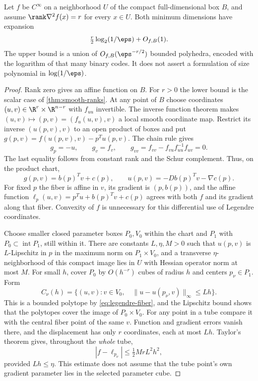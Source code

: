 \begin{theorem}\label{thm:constant-rank}
Let $f$ be $C^\infty$ on a neighborhood $U$ of the compact
full-dimensional box $B$, and assume $\rank\nabla^2f(x)=r$ for every
$x\in U$. Both minimum dimensions have expansion
\[
 \tfrac r2\log_2(1/\eps)+O_{f,B}(1).
\]
The upper bound is a union of $O_{f,B}(\eps^{-r/2})$ bounded polyhedra,
encoded with the logarithm of that many binary codes. It does not
assert a formulation of size polynomial in $\log(1/\eps)$.
\end{theorem}
\begin{proof}
Rank zero gives an affine function on $B$. For $r>0$ the lower bound
is the scalar case of \cref{thm:smooth-ranks}. At any point of $B$
choose coordinates $(u,v)\in\R^r\times\R^{n-r}$ with $f_{uu}$
invertible. The inverse function theorem makes
$(u,v)\mapsto(p,v)=(f_u(u,v),v)$ a local smooth coordinate map.
Restrict its inverse $(u(p,v),v)$ to an open product of boxes and put
$g(p,v)=f(u(p,v),v)-p^Tu(p,v)$. The chain rule gives
\[
 g_p=-u,\qquad g_v=f_v,\qquad
 g_{vv}=f_{vv}-f_{vu}f_{uu}^{-1}f_{uv}=0.
\]
The last equality follows from constant rank and the Schur complement.
Thus, on the product chart,
\begin{equation}\label{eq:legendre-fiber}
 g(p,v)=b(p)^Tv+c(p),\qquad
 u(p,v)=-Db(p)^Tv-\nabla c(p).
\end{equation}
For fixed $p$ the fiber is affine in $v$, its gradient is
$(p,b(p))$, and the affine function
$\ell_p(u,v)=p^Tu+b(p)^Tv+c(p)$ agrees with both $f$ and its gradient
along that fiber. Convexity of $f$ is unnecessary for this differential
use of Legendre coordinates.

Choose smaller closed parameter boxes $P_0,V_0$ within the chart and
$P_1$ with $P_0\subset\operatorname{int}P_1$, still within it.
There are constants $L,\eta,M>0$ such that $u(p,v)$ is $L$-Lipschitz
in $p$ in the maximum norm on $P_1\times V_0$, and a transverse
$\eta$-neighborhood of this compact image lies in $U$ with Hessian
operator norm at most $M$. For small $h$, cover $P_0$ by
$O(h^{-r})$ cubes of radius $h$ and centers $p_\nu\in P_1$. Form
\[
 C_\nu(h)=\{(u,v):v\in V_0,\quad
                  \|u-u(p_\nu,v)\|_\infty\le Lh\}.
\]
This is a bounded polytope by \eqref{eq:legendre-fiber}, and the
Lipschitz bound shows that the polytopes cover the image of
$P_0\times V_0$. For any point in a tube compare it with the central
fiber point of the same $v$. Function and gradient errors vanish there,
and the displacement has only $r$ coordinates, each at most $Lh$.
Taylor's theorem gives, throughout the \emph{whole} tube,
\[
 |f-\ell_{p_\nu}|\le\tfrac12MrL^2h^2,
\]
provided $Lh\le\eta$. This estimate does not assume that the tube
point's own gradient parameter lies in the selected parameter cube.


\end{proof}
